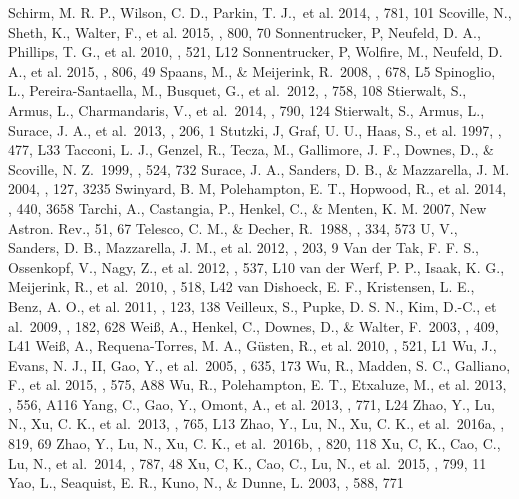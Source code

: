 \documentclass[preprint]{aastex}
\begin{document}
\begin{references}
 Schirm, M. R. P., Wilson, C. D., Parkin, T. J.,~et al. 2014, \apj, 781, 101
 Scoville, N., Sheth, K., Walter, F., et al. 2015, \apj, 800, 70
 Sonnentrucker, P, Neufeld, D. A., Phillips, T. G., et al. 2010, \aap, 521, L12
 Sonnentrucker, P, Wolfire, M., Neufeld, D. A., et al. 2015, \apj, 806, 49
 Spaans, M., \& Meijerink, R.~2008, \apj, 678, L5
 Spinoglio, L., Pereira-Santaella, M., Busquet, G., et al.~2012, \apj, 758, 108
 Stierwalt, S., Armus, L., Charmandaris, V., et al.~2014, \apj, 790, 124
 Stierwalt, S., Armus, L., Surace, J. A., et al.~2013, \apjs, 206, 1
 Stutzki, J, Graf, U. U., Haas, S., et al. 1997, \apj, 477, L33
 Tacconi, L. J., Genzel, R., Tecza, M., Gallimore, J. F., Downes, D., \& Scoville, N. Z.~1999, \apj, 524, 732
 Surace, J. A., Sanders, D. B., \& Mazzarella, J. M. 2004, \apj, 127, 3235
 Swinyard, B. M, Polehampton, E. T., Hopwood, R., et al. 2014, \mnras, 440, 3658
 Tarchi, A., Castangia, P., Henkel, C., \& Menten, K. M. 2007, New Astron. Rev., 51, 67
 Telesco, C. M., \& Decher, R.~1988, \apj, 334, 573
 U, V., Sanders, D. B., Mazzarella, J. M., et al. 2012, \apjs, 203, 9
 Van der Tak, F. F. S., Ossenkopf, V., Nagy, Z., et al. 2012, \aap, 537, L10
 van der Werf, P. P., Isaak, K. G., Meijerink, R., et al.~2010, \aap, 518, L42
 van Dishoeck, E. F., Kristensen, L. E., Benz, A. O., et al. 2011, \pasp, 123, 138
 Veilleux, S., Pupke, D. S. N., Kim, D.-C., et al.~2009, \apjs, 182, 628
 Wei\ss, A., Henkel, C., Downes, D., \& Walter, F.~2003, \aap, 409, L41
 Wei\ss, A., Requena-Torres, M. A., G\"usten, R., et al. 2010, \aap, 521, L1
 Wu, J., Evans, N. J., II, Gao, Y., et al.~2005, \apj, 635, 173
 Wu, R., Madden, S. C., Galliano, F., et al. 2015, \aap, 575, A88
 Wu, R., Polehampton, E. T., Etxaluze, M., et al. 2013, \aap, 556, A116
 Yang, C., Gao, Y., Omont, A., et al. 2013, \apj, 771, L24
 Zhao, Y., Lu, N., Xu, C. K., et al.~2013, \apj, 765, L13
 Zhao, Y., Lu, N., Xu, C. K., et al.~2016a, \apj, 819, 69
 Zhao, Y., Lu, N., Xu, C. K., et al.~2016b, \apj, 820, 118
 Xu, C, K., Cao, C., Lu, N., et al.~2014, \apj, 787, 48 
 Xu, C, K., Cao, C., Lu, N., et al.~2015, \apj, 799, 11 
 Yao, L., Seaquist, E. R., Kuno, N., \& Dunne, L. 2003, \apj, 588, 771
\end{references}
\newpage
\end{document}
